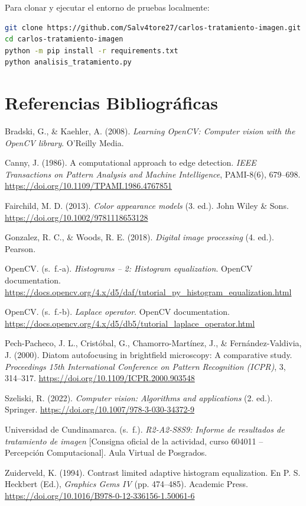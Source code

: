 \documentclass[12pt,letterpaper]{article}
\newcommand{\refapa}[1]{\par\noindent\hangindent=0.5in\hangafter=1 #1\par}
\begin{document}
Para clonar y ejecutar el entorno de pruebas localmente:
\begin{lstlisting}[language=bash]
git clone https://github.com/Salv4tore27/carlos-tratamiento-imagen.git
cd carlos-tratamiento-imagen
python -m pip install -r requirements.txt
python analisis_tratamiento.py
\end{lstlisting}

\newpage
\section{Referencias Bibliogr\'aficas}
\refapa{Bradski, G., \& Kaehler, A. (2008). \textit{Learning OpenCV: Computer vision with the OpenCV library}. O'Reilly Media.}
\refapa{Canny, J. (1986). A computational approach to edge detection. \textit{IEEE Transactions on Pattern Analysis and Machine Intelligence}, PAMI-8(6), 679--698. \url{https://doi.org/10.1109/TPAMI.1986.4767851}}
\refapa{Fairchild, M. D. (2013). \textit{Color appearance models} (3.\textordfeminine{} ed.). John Wiley \& Sons. \url{https://doi.org/10.1002/9781118653128}}
\refapa{Gonzalez, R. C., \& Woods, R. E. (2018). \textit{Digital image processing} (4.\textordfeminine{} ed.). Pearson.}
\refapa{OpenCV. (s.~f.-a). \textit{Histograms -- 2: Histogram equalization}. OpenCV documentation. \url{https://docs.opencv.org/4.x/d5/daf/tutorial_py_histogram_equalization.html}}
\refapa{OpenCV. (s.~f.-b). \textit{Laplace operator}. OpenCV documentation. \url{https://docs.opencv.org/4.x/d5/db5/tutorial_laplace_operator.html}}
\refapa{Pech-Pacheco, J. L., Crist\'obal, G., Chamorro-Mart\'inez, J., \& Fern\'andez-Valdivia, J. (2000). Diatom autofocusing in brightfield microscopy: A comparative study. \textit{Proceedings 15th International Conference on Pattern Recognition (ICPR)}, 3, 314--317. \url{https://doi.org/10.1109/ICPR.2000.903548}}
\refapa{Szeliski, R. (2022). \textit{Computer vision: Algorithms and applications} (2.\textordfeminine{} ed.). Springer. \url{https://doi.org/10.1007/978-3-030-34372-9}}
\refapa{Universidad de Cundinamarca. (s.~f.). \textit{R2-A2-S8S9: Informe de resultados de tratamiento de imagen} [Consigna oficial de la actividad, curso 604011 -- Percepci\'on Computacional]. Aula Virtual de Posgrados.}
\refapa{Zuiderveld, K. (1994). Contrast limited adaptive histogram equalization. En P. S. Heckbert (Ed.), \textit{Graphics Gems IV} (pp. 474--485). Academic Press. \url{https://doi.org/10.1016/B978-0-12-336156-1.50061-6}}
\end{document}

